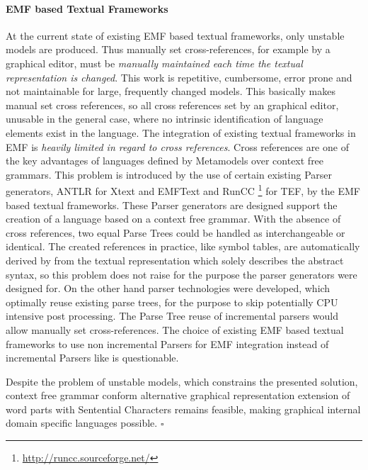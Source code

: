 \paragraph{EMF based Textual Frameworks}
At the current state of existing EMF based textual frameworks, only unstable models are produced. Thus manually set cross-references, for example by a graphical editor, must be \emph{manually maintained each time the textual representation is changed}. This work is repetitive, cumbersome, error prone and not maintainable for large, frequently changed models. This basically makes manual set cross references, so all cross references set by an graphical editor, unusable in the general case, where no intrinsic identification of language elements exist in the language. The integration of existing textual frameworks in EMF is \emph{heavily limited in regard to cross references}. Cross references are one of the key advantages of languages defined by Metamodels over context free grammars. This problem is introduced by the use of certain existing Parser generators, ANTLR for Xtext and EMFText and RunCC \footnote{\raggedright \url{http://runcc.sourceforge.net/}} for TEF, by the EMF based textual frameworks. These Parser generators are designed support the creation of a language based on a context free grammar. With the absence of cross references, two equal Parse Trees could be handled as interchangeable or identical. The created references in practice, like symbol tables, are automatically derived by from the textual representation which solely describes the abstract syntax, so this problem does not raise for the purpose the parser generators were designed for. On the other hand parser technologies were developed, which optimally reuse existing parse trees, for the purpose to skip potentially CPU intensive post processing. The Parse Tree reuse of incremental parsers would allow manually set cross-references. The choice of existing EMF based textual frameworks to use non incremental Parsers for EMF integration instead of incremental Parsers like \cite{xglr} is questionable.


Despite the problem of unstable models, which constrains the presented solution, context free grammar conform alternative graphical representation extension of word parts with Sentential Characters remains feasible, making graphical internal domain specific languages possible. 
$\square$
